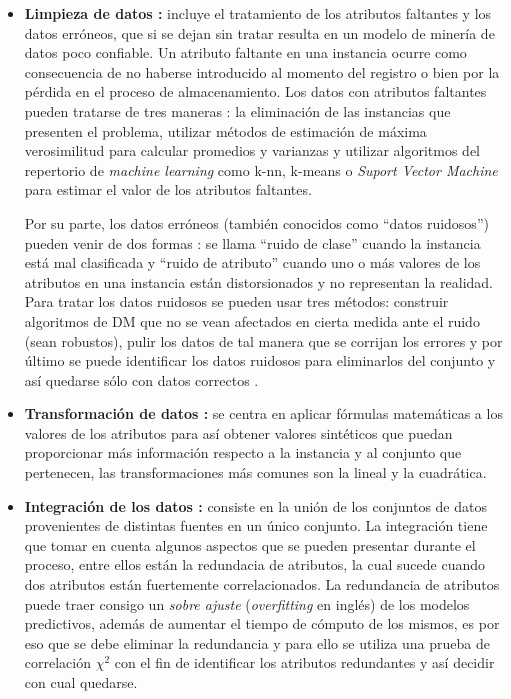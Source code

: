 \begin{itemize}
\item \textbf{Limpieza de datos \cite{garcia2016data, kim2003taxonomy}:}
incluye el tratamiento de los atributos faltantes y los datos erróneos, que si se dejan sin tratar resulta en un modelo de minería de datos poco confiable. Un atributo faltante en una instancia ocurre como consecuencia de no haberse introducido al momento del registro o bien por la pérdida en el proceso de almacenamiento. Los datos con atributos faltantes pueden tratarse de tres maneras \cite{farhangfar2007novel}: la eliminación de las instancias que presenten el problema, utilizar métodos de estimación de máxima verosimilitud para calcular promedios y varianzas y utilizar algoritmos del repertorio de \emph{machine learning} como k-nn, k-means o  \emph{Suport Vector Machine} para estimar el valor de los atributos faltantes. 

Por su parte, los datos erróneos (también conocidos como ``datos ruidosos'') pueden venir de dos formas \cite{catal2011class}: se llama ``ruido de clase'' cuando la instancia está mal clasificada y ``ruido de atributo'' cuando uno o más valores de los atributos en una instancia están distorsionados y no representan la realidad. Para tratar los datos ruidosos se pueden usar tres métodos: construir algoritmos de DM que no se vean afectados en cierta medida ante el ruido (sean robustos), pulir los datos \cite{teng1999correcting} de tal manera que se corrijan los errores y por último se puede identificar los datos ruidosos para eliminarlos del conjunto y así quedarse sólo con datos correctos \cite{brodley1999identifying}.

\item \textbf{Transformación de datos \cite{garcia2016data}:}
se centra en aplicar fórmulas matemáticas a los valores de los atributos para así obtener valores sintéticos que puedan proporcionar más información respecto a la instancia y al conjunto que pertenecen, las transformaciones más comunes son la lineal y la cuadrática.

\item \textbf{Integración de los datos \cite{garcia2016data,batini1986comparative}:}
consiste en la unión de los conjuntos de datos provenientes de distintas fuentes en un único conjunto. La integración tiene que tomar en cuenta algunos aspectos que se pueden presentar durante el proceso, entre ellos están la redundacia de atributos, la cual sucede cuando dos atributos están fuertemente correlacionados. La redundancia de atributos puede traer consigo un \emph{sobre ajuste} (\emph{overfitting} en inglés) de los modelos predictivos, además de aumentar el tiempo de cómputo de los mismos, es por eso que se debe eliminar la redundancia y para ello se utiliza una prueba de correlación $\chi^2$ con el fin de identificar los atributos redundantes y así decidir con cual quedarse. 


\end{itemize}
